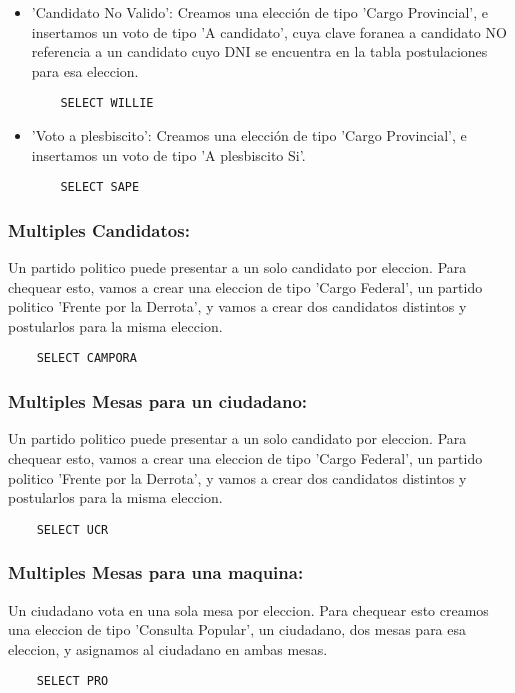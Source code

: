 \begin{enumerate}
\begin{itemize}
	\item 'Candidato No Valido': Creamos una elección de tipo 'Cargo Provincial', e insertamos un voto
	de tipo 'A candidato', cuya clave foranea a candidato NO referencia a un candidato cuyo DNI se encuentra en la tabla postulaciones para esa eleccion.
	\begin{lstlisting}
	SELECT WILLIE
	\end{lstlisting}
		
	\item 'Voto a plesbiscito': Creamos una elección de tipo 'Cargo Provincial', e insertamos un voto
	de tipo 'A plesbiscito Si'.
	\begin{lstlisting}
	SELECT SAPE
	\end{lstlisting}
			
	\end{itemize}
\end{enumerate}
\subsubsection{Multiples Candidatos:} Un partido politico puede presentar a un solo candidato por eleccion. Para chequear esto, vamos a crear una eleccion de tipo 'Cargo Federal', un partido politico
'Frente por la Derrota', y vamos a crear dos candidatos distintos y postularlos para la misma eleccion.
	\begin{lstlisting}
	SELECT CAMPORA
	\end{lstlisting}
			

\subsubsection{Multiples Mesas para un ciudadano:} Un partido politico puede presentar a un solo candidato por eleccion. Para chequear esto, vamos a crear una eleccion de tipo 'Cargo Federal', un partido politico
'Frente por la Derrota', y vamos a crear dos candidatos distintos y postularlos para la misma eleccion.
	\begin{lstlisting}
	SELECT UCR
	\end{lstlisting}
			

\subsubsection{Multiples Mesas para una  maquina:} Un ciudadano vota en una sola mesa por eleccion. Para chequear esto creamos una eleccion de tipo 'Consulta Popular', un ciudadano, dos mesas para esa eleccion, y asignamos al ciudadano en ambas mesas.
	\begin{lstlisting}
	SELECT PRO
	\end{lstlisting}
								
